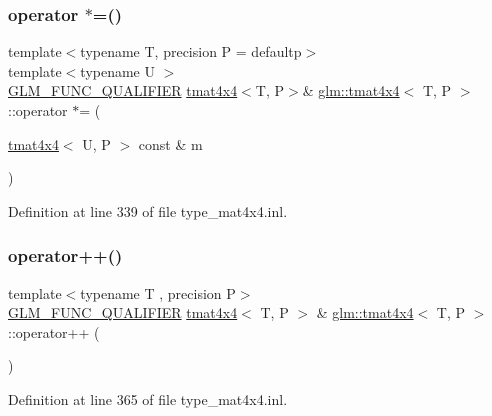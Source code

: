\subsubsection{\texorpdfstring{operator $\ast$=()}{operator *=()}\hspace{0.1cm}{\footnotesize\ttfamily [4/4]}}
{\footnotesize\ttfamily template$<$typename T, precision P = defaultp$>$ \\
template$<$typename U $>$ \\
\mbox{\hyperlink{setup_8hpp_a33fdea6f91c5f834105f7415e2a64407}{G\+L\+M\+\_\+\+F\+U\+N\+C\+\_\+\+Q\+U\+A\+L\+I\+F\+I\+ER}} \mbox{\hyperlink{structglm_1_1tmat4x4}{tmat4x4}}$<$T, P$>$\& \mbox{\hyperlink{structglm_1_1tmat4x4}{glm\+::tmat4x4}}$<$ T, P $>$\+::operator $\ast$= (\begin{DoxyParamCaption}\item[{\mbox{\hyperlink{structglm_1_1tmat4x4}{tmat4x4}}$<$ U, P $>$ const \&}]{m }\end{DoxyParamCaption})}



Definition at line 339 of file type\+\_\+mat4x4.\+inl.

\mbox{\label{structglm_1_1tmat4x4_a1ad2e416dfded77b7c5b9c7cc5593a82}} 
\subsubsection{\texorpdfstring{operator++()}{operator++()}\hspace{0.1cm}{\footnotesize\ttfamily [1/2]}}
{\footnotesize\ttfamily template$<$typename T , precision P$>$ \\
\mbox{\hyperlink{setup_8hpp_a33fdea6f91c5f834105f7415e2a64407}{G\+L\+M\+\_\+\+F\+U\+N\+C\+\_\+\+Q\+U\+A\+L\+I\+F\+I\+ER}} \mbox{\hyperlink{structglm_1_1tmat4x4}{tmat4x4}}$<$ T, P $>$ \& \mbox{\hyperlink{structglm_1_1tmat4x4}{glm\+::tmat4x4}}$<$ T, P $>$\+::operator++ (\begin{DoxyParamCaption}{ }\end{DoxyParamCaption})}



Definition at line 365 of file type\+\_\+mat4x4.\+inl.

\mbox{\label{structglm_1_1tmat4x4_aa3265b4bdfd401c53ffabe57f631f1ca}} 
